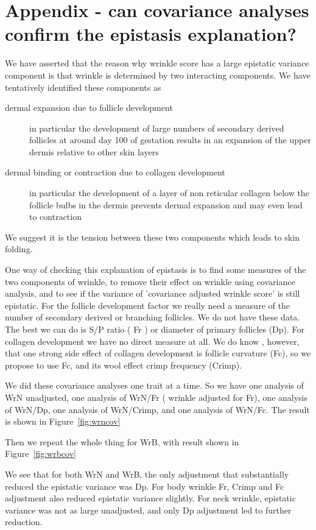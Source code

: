 \documentclass[titlepage]{article}  %
\begin{document}
\section{Appendix - can covariance analyses confirm the epistasis explanation?}
We have asserted that the reason why wrinkle score has a large epistatic variance component is that wrinkle is determined by two interacting components. We have tentatively identified these components as
\begin{description}
\item[dermal expansion due to follicle development] in particular the development of large numbers of secondary derived follicles at around day 100 of gestation results in an expansion of the upper dermis relative to other skin layers
\item[dermal binding or contraction due to collagen development] in particular  the development of a layer of non reticular collagen below the follicle bulbs in the dermis prevents dermal expansion and may even lead to contraction
\end{description}
We suggest it is the tension between these two components which leads to skin folding.

One way of checking  this explanation of epistasis is to find some measures of the two components of wrinkle, to remove their effect on wrinkle using covariance analysis, and to see if the variance of 'covariance adjusted wrinkle score'  is still epistatic. For the follicle development factor we really need a measure of the number of secondary derived or branching follicles. We do not have these data. The best we can do is S/P ratio ( Fr ) or diameter of primary follicles (Dp). For collagen development we have no direct measure at all. We do know , however, that one strong side effect of collagen development is follicle curvature (Fc), so we propose to use Fc, and its wool effect crimp frequency (Crimp).

We did these covariance analyses one trait at a time. So we have one analysis of WrN unadjusted, one analysis of WrN/Fr ( wrinkle adjusted for Fr), one analysis of WrN/Dp, one analysis of WrN/Crimp, and one analysis of WrN/Fc. The result is shown in Figure~\ref{fig:wrncov}

Then we repeat the whole thing for WrB, with result shown in Figure~\ref{fig:wrbcov}

We see that for both WrN and WrB, the only adjustment that substantially reduced the epistatic variance was Dp. For body wrinkle Fr, Crimp and Fc adjustment also reduced epistatic variance slightly. For neck wrinkle, epistatic variance was not as large unadjusted, and only Dp adjustment led to further  reduction.
\end{document}

